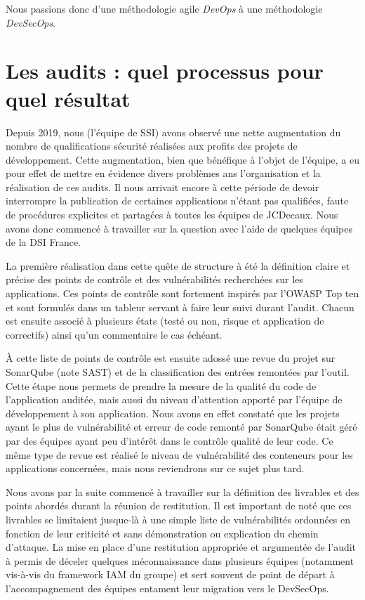 Nous passions donc d'une méthodologie agile \emph{DevOps} à une méthodologie \emph{DevSecOps}.

\newpage

\section{Les audits : quel processus pour quel résultat}
Depuis 2019, nous (l'équipe de \ac{SSI}) avons observé une nette augmentation du nombre de qualifications sécurité réalisées
aux profits des projets de développement. Cette augmentation, bien que bénéfique à l'objet de l'équipe, a eu pour effet 
de mettre en évidence divers problèmes ans l'organisation et la réalisation de ces audits.
\newline Il nous arrivait encore à cette période de devoir interrompre la publication de certaines applications n'étant 
pas qualifiées, faute de procédures explicites et partagées à toutes les équipes de JCDecaux. Nous avons donc commencé à 
travailler sur la question avec l'aide de quelques équipes de la \ac{DSI} France.

La première réalisation dans cette quête de structure à été la définition claire et précise des points de contrôle et 
des vulnérabilités recherchées sur les applications. Ces points de contrôle sont fortement inspirés par l'OWASP Top ten
\autocite{owasp_top10_2017} et sont formulés dans un tableur servant à faire leur suivi durant l'audit. Chacun est 
ensuite associé à plusieurs états (testé ou non, risque et application de correctifs) ainsi qu'un commentaire le cas 
échéant.

À cette liste de points de contrôle est ensuite adossé une revue du projet sur SonarQube (note \ac{SAST}) et de la 
classification des entrées remontées par l'outil. Cette étape nous permets de prendre la mesure de la qualité du code de 
l'application auditée, mais aussi du niveau d'attention apporté par l'équipe de développement à son application.
\newline Nous avons en effet constaté que les projets ayant le plus de vulnérabilité et erreur de code remonté par 
SonarQube était géré par des équipes ayant peu d'intérêt dans le contrôle qualité de leur code.
\newline Ce même type de revue est réalisé le niveau de vulnérabilité des conteneurs pour les applications concernées, 
mais nous reviendrons sur ce sujet plus tard.

Nous avons par la suite commencé à travailler sur la définition des livrables et des points abordés durant la réunion de
restitution. Il est important de noté que ces livrables se limitaient jusque-là à une simple liste de vulnérabilités
ordonnées en fonction de leur criticité et sans démonstration ou explication du chemin d'attaque.
\newline  La mise en place d'une restitution appropriée et argumentée de l'audit à permis de déceler quelques 
méconnaissance dans plusieurs équipes (notamment vis-à-vis du framework IAM du groupe) et sert souvent de point de départ 
à l'accompagnement des équipes entament leur migration vers le DevSecOps.

